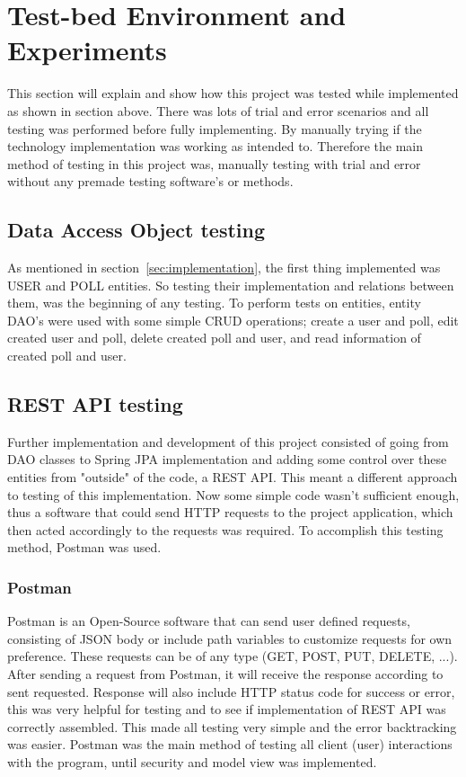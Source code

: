 \section{Test-bed Environment and Experiments}
\label{sec:evaluation}

This section will explain and show how this project was tested while implemented as shown in section above. There was lots of trial and error scenarios and all testing was performed before fully implementing. By manually trying if the technology implementation was working as intended to.
Therefore the main method of testing in this project was, manually testing with trial and error without any premade testing software's or methods.
\subsection{Data Access Object testing}
As mentioned in section~\ref{sec:implementation}, the first thing implemented was USER and POLL entities. So testing their implementation and relations between them, was the beginning of any testing. To perform tests on entities, entity DAO's were used with some simple CRUD operations; create a user and poll, edit created user and poll, delete created poll and user, and read information of created poll and user.

\subsection{REST API testing}
Further implementation and development of this project consisted of going from DAO classes to Spring JPA implementation and adding some control over these entities from "outside" of the code, a REST API. This meant a different approach to testing of this implementation. Now some simple code wasn't sufficient enough, thus a software that could send HTTP requests to the project application, which then acted accordingly to the requests was required. To accomplish this testing method, Postman \cite{postman} was used.
\subsubsection{Postman}
Postman is an Open-Source software that can send user defined requests, consisting of JSON body or include path variables to customize requests for own preference. These requests can be of any type (GET, POST, PUT, DELETE, ...). After sending a request from Postman, it will receive the response according to sent requested. Response will also include HTTP status code for success or error, this was very helpful for testing and to see if implementation of REST API was correctly assembled. This made all testing very simple and the error backtracking was easier. Postman was the main method of testing all client (user) interactions with the program, until security and model view was implemented.

